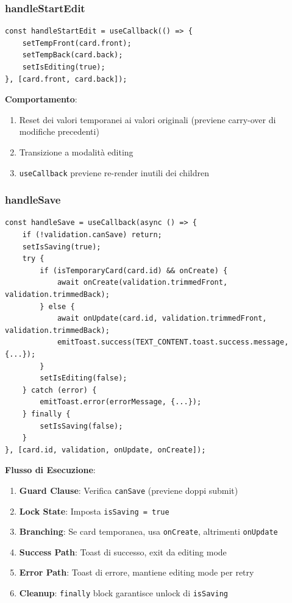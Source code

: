 \documentclass[11pt,a4paper]{article}
\begin{document}
\subsubsection{handleStartEdit}

\begin{lstlisting}[style=typescript, caption=Handler Inizio Editing]
const handleStartEdit = useCallback(() => {
    setTempFront(card.front);
    setTempBack(card.back);
    setIsEditing(true);
}, [card.front, card.back]);
\end{lstlisting}

\textbf{Comportamento}: 
\begin{enumerate}
    \item Reset dei valori temporanei ai valori originali (previene carry-over di modifiche precedenti)
    \item Transizione a modalità editing
    \item \texttt{useCallback} previene re-render inutili dei children
\end{enumerate}

\subsubsection{handleSave}

\begin{lstlisting}[style=typescript, caption=Handler Salvataggio]
const handleSave = useCallback(async () => {
    if (!validation.canSave) return;
    setIsSaving(true);
    try {
        if (isTemporaryCard(card.id) && onCreate) {
            await onCreate(validation.trimmedFront, validation.trimmedBack);
        } else {
            await onUpdate(card.id, validation.trimmedFront, validation.trimmedBack);
            emitToast.success(TEXT_CONTENT.toast.success.message, {...});
        }
        setIsEditing(false);
    } catch (error) {
        emitToast.error(errorMessage, {...});
    } finally {
        setIsSaving(false);
    }
}, [card.id, validation, onUpdate, onCreate]);
\end{lstlisting}

\textbf{Flusso di Esecuzione}:
\begin{enumerate}
    \item \textbf{Guard Clause}: Verifica \texttt{canSave} (previene doppi submit)
    \item \textbf{Lock State}: Imposta \texttt{isSaving = true}
    \item \textbf{Branching}: Se card temporanea, usa \texttt{onCreate}, altrimenti \texttt{onUpdate}
    \item \textbf{Success Path}: Toast di successo, exit da editing mode
    \item \textbf{Error Path}: Toast di errore, mantiene editing mode per retry
    \item \textbf{Cleanup}: \texttt{finally} block garantisce unlock di \texttt{isSaving}
\end{enumerate}
\end{document}
